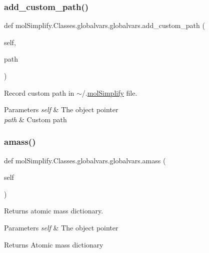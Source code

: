 \subsubsection{\texorpdfstring{add\+\_\+custom\+\_\+path()}{add\_custom\_path()}}
{\footnotesize\ttfamily def mol\+Simplify.\+Classes.\+globalvars.\+globalvars.\+add\+\_\+custom\+\_\+path (\begin{DoxyParamCaption}\item[{}]{self,  }\item[{}]{path }\end{DoxyParamCaption})}



Record custom path in $\sim$/.\hyperlink{namespacemolSimplify}{mol\+Simplify} file. 


\begin{DoxyParams}{Parameters}
{\em self} & The object pointer \\
\hline
{\em path} & Custom path \\
\hline
\end{DoxyParams}
\mbox{\label{classmolSimplify_1_1Classes_1_1globalvars_1_1globalvars_a3445aa2f86c723616f75e37c9fb8e648}} 
\subsubsection{\texorpdfstring{amass()}{amass()}}
{\footnotesize\ttfamily def mol\+Simplify.\+Classes.\+globalvars.\+globalvars.\+amass (\begin{DoxyParamCaption}\item[{}]{self }\end{DoxyParamCaption})}



Returns atomic mass dictionary. 


\begin{DoxyParams}{Parameters}
{\em self} & The object pointer \\
\hline
\end{DoxyParams}
\begin{DoxyReturn}{Returns}
Atomic mass dictionary 
\end{DoxyReturn}
\mbox{\label{classmolSimplify_1_1Classes_1_1globalvars_1_1globalvars_a056773e84caa30b9ef6bb482f7ebd68d}} 
